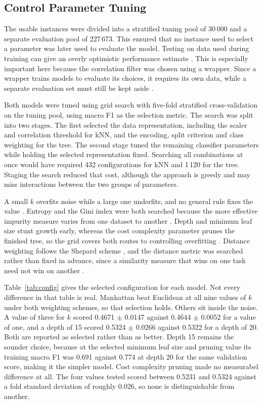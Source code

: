 \documentclass[conference]{IEEEtran}
\begin{document}
\subsection{Control Parameter Tuning}
\label{sec:tuning}

The usable instances were divided into a stratified tuning pool of 30\,000 and a 
separate evaluation pool of 227\,673. This ensured that no instance used to 
select a parameter was later used to evaluate the model. Testing on data used 
during training can give an overly optimistic performance estimate \cite{kelleher2015}. 
This is especially important here because the correlation filter was chosen using a 
wrapper. Since a wrapper trains models to evaluate its choices, it requires its 
own data, while a separate evaluation set must still be kept aside 
\cite{kelleher2015}.

Both models were tuned using grid search with five-fold stratified
cross-validation on the tuning pool, using macro F1 as the selection metric.
The search was split into two stages. The first selected the data
representation, including the scaler and correlation threshold for kNN, and the
encoding, split criterion and class weighting for the tree. The second stage
tuned the remaining classifier parameters while holding the selected
representation fixed. Searching all combinations at once would have required
432 configurations for kNN and 1\,120 for the tree. Staging the search reduced
that cost, although the approach is greedy and may miss interactions between
the two groups of parameters.

A small $k$ overfits noise while a large one underfits, and no general rule
fixes the value \cite{kelleher2015}. Entropy and the Gini index were both
searched because the more effective impurity measure varies from one dataset to
another \cite{kelleher2015}. Depth and minimum leaf size stunt growth early,
whereas the cost complexity parameter prunes the finished tree, so the grid
covers both routes to controlling overfitting \cite{kelleher2015}. Distance
weighting follows the Shepard scheme \cite{topic3}, and the distance metric was
searched rather than fixed in advance, since a similarity measure that wins on
one task need not win on another \cite{rodden2000}.

Table~\ref{tab:config} gives the selected configuration for each model. Not
every difference in that table is real. Manhattan beat Euclidean at all nine
values of $k$ under both weighting schemes, so that selection holds. Others sit
inside the noise. A value of three for $k$ scored 0.4671 $\pm$ 0.0147 against
0.4644 $\pm$ 0.0052 for a value of one, and a depth of 15 scored 0.5324 $\pm$
0.0266 against 0.5322 for a depth of 20. Both are reported as selected rather
than as better. Depth 15 remains the sounder choice, because at the selected minimum leaf size
and pruning value its training macro F1 was 0.691 against 0.774 at depth 20 for
the same validation score, making it the simpler model. Cost complexity pruning
made no measurabel difference at all. The four values tested scored between
0.5231 and 0.5324 against a fold standard deviation of roughly 0.026, so none
is distinguishable from another.
\end{document}

